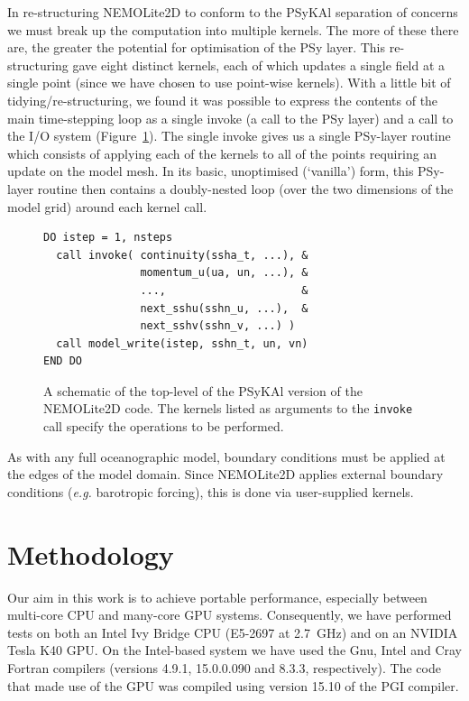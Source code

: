 \documentclass[gmdd, manuscript]{copernicus}
\begin{document}
In re-structuring NEMOLite2D to conform to the {PS}y{KA}l separation
of concerns we must break up the computation into multiple
kernels. The more of these there are, the greater the potential for
optimisation of the {PS}y layer. This re-structuring gave eight distinct
kernels, each of which updates a single field at a single point (since
we have chosen to use point-wise kernels). With a little bit of
tidying/re-structuring, we found it was possible to express the
contents of the main time-stepping loop as a single invoke (a call to
the PSy layer) and a call to the I/O system
(Figure~\ref{FIG_psykal_nemolite2d_structure}). The single invoke
gives us a single PSy-layer routine which consists of applying each of
the kernels to all of the points requiring an update on the model
mesh. In its basic, unoptimised (`vanilla') form, this PSy-layer
routine then contains a doubly-nested loop (over the two dimensions of
the model grid) around each kernel call.

\begin{figure}
\centering
\begin{verbatim}
DO istep = 1, nsteps
  call invoke( continuity(ssha_t, ...), &
               momentum_u(ua, un, ...), &
               ...,                     &
               next_sshu(sshn_u, ...),  &
               next_sshv(sshn_v, ...) )
  call model_write(istep, sshn_t, un, vn)
END DO
\end{verbatim}
\caption{A schematic of the top-level of the {PS}y{KA}l version of the
  NEMOLite2D code. The kernels listed as arguments to the \texttt{invoke}
call specify the operations to be performed.}
\label{FIG_psykal_nemolite2d_structure}
\end{figure}

As with any full oceanographic model, boundary conditions must be
applied at the edges of the model domain. Since NEMOLite2D applies
external boundary conditions (\textit{e.g.} barotropic forcing), this is
done via user-supplied kernels.


\section{Methodology}
\label{sec_methodology}

Our aim in this work is to achieve portable performance, especially
between multi-core CPU and many-core GPU systems. Consequently, we
have performed tests on both an Intel Ivy Bridge CPU (E5-2697 at
2.7~GHz) and on an NVIDIA Tesla K40 GPU.  On the Intel-based system we
have used the Gnu, Intel and Cray Fortran compilers (versions 4.9.1,
15.0.0.090 and 8.3.3, respectively). The code that made use of the GPU
was compiled using version 15.10 of the PGI compiler.
\end{document}
